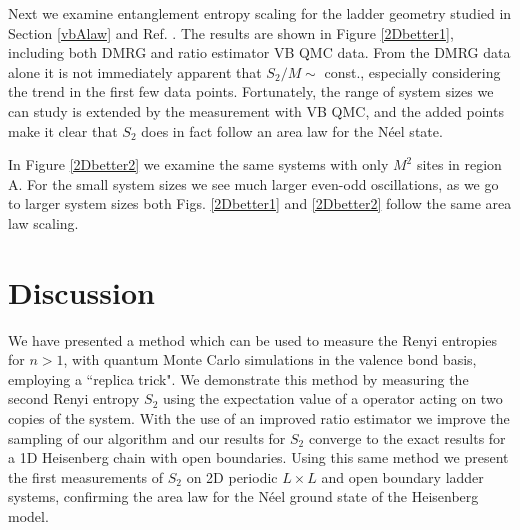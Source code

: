 Next we examine entanglement entropy scaling for the ladder geometry studied in Section \ref{vbAlaw} and Ref. \cite{PRL1}.
The results are shown in Figure \ref{2Dbetter1}, including both DMRG and ratio estimator VB QMC data.  
From the DMRG data alone it is not immediately apparent that $S_2/M \sim$ const., especially considering the trend in the first few data points. 
Fortunately, the range of system sizes we can study is extended by the \swa measurement with VB QMC, and the added points make it clear that $S_2$ does in fact follow an area law for the N\'eel state.

In Figure \ref{2Dbetter2} we examine the same systems with only $M^2$ sites in region A.
For the small system sizes we see much larger even-odd oscillations, as we go to larger system sizes both Figs. \ref{2Dbetter1} and \ref{2Dbetter2} follow the same area law scaling.





\section{Discussion}



We have presented a method which can be used to measure the Renyi entropies for $n>1$, with quantum Monte Carlo simulations in the valence bond basis, employing a ``replica trick".
We demonstrate this method by measuring the second Renyi entropy $S_2$ using the expectation value of a \swa operator acting on two copies of the system.
With the use of an improved ratio estimator we improve the sampling of our algorithm and our results for $S_2$ converge to the exact results for a 1D Heisenberg chain with open boundaries.
Using this same method we present the first measurements of $S_2$ on 2D periodic $L \times L$ and open boundary ladder systems, confirming the area law for the N\'eel ground state of the Heisenberg model.
 






